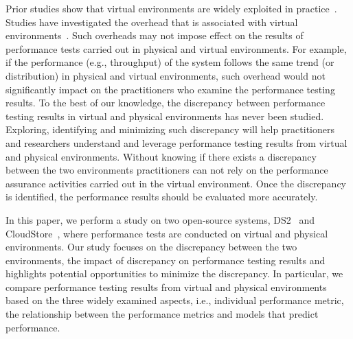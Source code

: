 Prior studies show that virtual environments are widely exploited in practice~\cite{Cito:2015:MCA:2786805.2786826,Nguyen:2012:ADP:2188286.2188344,xiong2013vperfguard}. Studies have investigated the overhead that is associated with virtual environments~\cite{menon2005diagnosing}. Such overheads may not impose effect on the results of performance tests carried out in physical and virtual environments. For example, if the performance (e.g., throughput) of the system follows the same trend (or distribution) in physical and virtual environments, such overhead would not significantly impact on the practitioners who examine the performance testing results. To the best of our knowledge, the discrepancy between performance testing results in virtual and physical environments has never been studied. Exploring, identifying and minimizing such discrepancy will help practitioners and researchers understand and leverage performance testing results from virtual and physical environments. Without knowing if there exists a discrepancy between the two environments practitioners can not rely on the performance assurance activities carried out in the virtual environment. Once the discrepancy is identified, the performance results should be evaluated more accurately.






In this paper, we perform a study on two open-source systems, DS2~\cite{delldvd} and CloudStore~\cite{cloudstore}, where performance tests are conducted on virtual and physical environments. Our study focuses on the discrepancy between the two environments, the impact of discrepancy on performance testing results and highlights potential opportunities to minimize the discrepancy. In particular, we compare performance testing results from virtual and physical environments based on the three widely examined aspects, i.e., individual performance metric, the relationship between the performance metrics and models that predict performance. 

